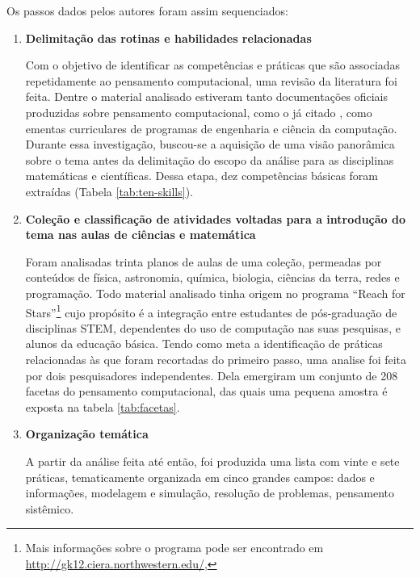 Os passos dados pelos autores foram assim sequenciados:

\begin{enumerate}
  \item \textbf{Delimitação das rotinas e habilidades relacionadas}

  Com o objetivo de identificar as competências e práticas que são associadas repetidamente ao pensamento computacional, uma revisão da literatura foi feita. Dentre o material analisado estiveram tanto documentações oficiais produzidas sobre pensamento computacional, como o já citado , como ementas curriculares de programas de engenharia e ciência da computação. Durante essa investigação, buscou-se a aquisição de uma visão panorâmica sobre o tema antes da delimitação do escopo da análise para as disciplinas matemáticas e científicas. Dessa etapa, dez competências básicas foram extraídas (Tabela \ref{tab:ten-skills}).

  

  \item \textbf{Coleção e classificação de atividades voltadas para a introdução do tema nas aulas de ciências e matemática} 
  
  Foram analisadas trinta planos de aulas de uma coleção, permeadas por conteúdos de física, astronomia, química, biologia, ciências da terra, redes e programação. Todo material analisado tinha origem no programa ``Reach for Stars''\footnote{Mais informações sobre o programa pode ser encontrado em \href{http://gk12.ciera.northwestern.edu/}{http://gk12.ciera.northwestern.edu/}, } cujo propósito é a integração entre estudantes de pós-graduação de disciplinas STEM, dependentes do uso de computação nas suas pesquisas, e alunos da educação básica. Tendo como meta a identificação de práticas relacionadas às que foram recortadas do primeiro passo, uma analise foi feita por dois pesquisadores independentes. Dela emergiram um conjunto de 208 facetas do pensamento computacional, das quais uma pequena amostra é exposta na tabela \ref{tab:facetas}.
  
  

  \item \textbf{Organização temática} 
  
  A partir da análise feita até então, foi produzida uma lista com vinte e sete práticas, tematicamente organizada em cinco grandes campos: dados e informações, modelagem e simulação, resolução de problemas, pensamento sistêmico.


\end{enumerate}
